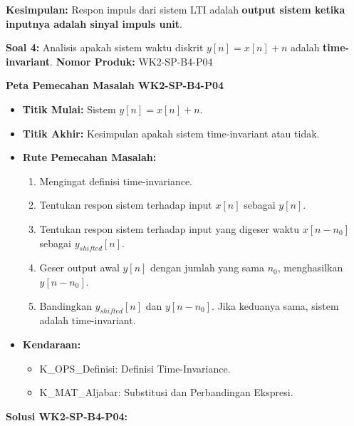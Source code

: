\documentclass[
  letterpaper,
  DIV=11,
  numbers=noendperiod]{scrreprt}
\providecommand{\tightlist}{%
  \setlength{\itemsep}{0pt}\setlength{\parskip}{0pt}}
\begin{document}
\textbf{Kesimpulan:} Respon impuls dari sistem LTI adalah \textbf{output
sistem ketika inputnya adalah sinyal impuls unit}.

\textbf{Soal 4:} Analisis apakah sistem waktu diskrit
\(y[n] = x[n] + n\) adalah \textbf{time-invariant}. \textbf{Nomor
Produk:} WK2-SP-B4-P04

\textbf{Peta Pemecahan Masalah WK2-SP-B4-P04}

\begin{itemize}
\tightlist
\item
  \textbf{Titik Mulai:} Sistem \(y[n] = x[n] + n\).
\item
  \textbf{Titik Akhir:} Kesimpulan apakah sistem time-invariant atau
  tidak.
\item
  \textbf{Rute Pemecahan Masalah:}

  \begin{enumerate}
  \def\labelenumi{\arabic{enumi}.}
  \tightlist
  \item
    Mengingat definisi time-invariance.
  \item
    Tentukan respon sistem terhadap input \(x[n]\) sebagai \(y[n]\).
  \item
    Tentukan respon sistem terhadap input yang digeser waktu
    \(x[n-n_0]\) sebagai \(y_{shifted}[n]\).
  \item
    Geser output awal \(y[n]\) dengan jumlah yang sama \(n_0\),
    menghasilkan \(y[n-n_0]\).
  \item
    Bandingkan \(y_{shifted}[n]\) dan \(y[n-n_0]\). Jika keduanya sama,
    sistem adalah time-invariant.
  \end{enumerate}
\item
  \textbf{Kendaraan:}

  \begin{itemize}
  \tightlist
  \item
    K\_OPS\_Definisi: Definisi Time-Invariance.
  \item
    K\_MAT\_Aljabar: Substitusi dan Perbandingan Ekspresi.
  \end{itemize}
\end{itemize}

\textbf{Solusi WK2-SP-B4-P04:}
\end{document}

